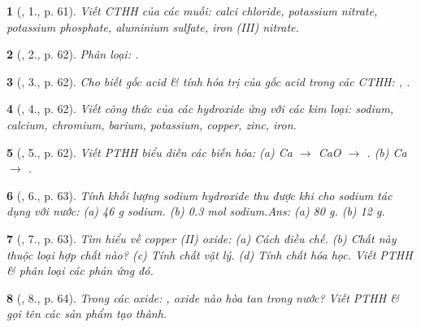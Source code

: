 \documentclass{article}
\newtheorem{baitoan}{}
\begin{document}
\begin{baitoan}[\cite{An_Hoa_Hoc_nang_cao_8_9}, 1., p. 61]
	Viết {\rm CTHH} của các muối: calci chloride, potassium nitrate, potassium phosphate, aluminium sulfate, iron ({\rm III}) nitrate.
\end{baitoan}

\begin{baitoan}[\cite{An_Hoa_Hoc_nang_cao_8_9}, 2., p. 62]
	Phân loại: {\rm{}}.
\end{baitoan}

\begin{baitoan}[\cite{An_Hoa_Hoc_nang_cao_8_9}, 3., p. 62]
	Cho biết gốc acid \& tính hóa trị của gốc acid trong các {\rm CTHH}: {\rm{}, }.
\end{baitoan}

\begin{baitoan}[\cite{An_Hoa_Hoc_nang_cao_8_9}, 4., p. 62]
	Viết công thức của các hydroxide ứng với các kim loại: sodium, calcium, chromium, barium, potassium, copper, zinc, iron.
\end{baitoan}

\begin{baitoan}[\cite{An_Hoa_Hoc_nang_cao_8_9}, 5., p. 62]
	Viết {\rm PTHH} biểu diễn các biến hóa: (a) {\rm Ca $\to$ CaO $\to$ }. (b) {\rm Ca $\to$ }.
\end{baitoan}

\begin{baitoan}[\cite{An_Hoa_Hoc_nang_cao_8_9}, 6., p. 63]
	Tính khối lượng sodium hydroxide thu được khi cho sodium tác dụng với nước: (a) {\rm46 g} sodium. (b) {0.3 mol} sodium.\hfill{\sf Ans: (a) 80 g. (b) 12 g.}
\end{baitoan}

\begin{baitoan}[\cite{An_Hoa_Hoc_nang_cao_8_9}, 7., p. 63]
	Tìm hiểu về copper ({\rm II}) oxide: (a) Cách điều chế. (b) Chất này thuộc loại hợp chất nào? (c) Tính chất vật lý. (d) Tính chất hóa học. Viết {\rm PTHH} \& phân loại các phản ứng đó.
\end{baitoan}

\begin{baitoan}[\cite{An_Hoa_Hoc_nang_cao_8_9}, 8., p. 64]
	Trong các oxide: {\rm{}}, oxide nào hòa tan trong nước? Viết {\rm PTHH} \& gọi tên các sản phẩm tạo thành.
\end{baitoan}
\end{document}
